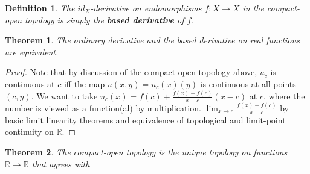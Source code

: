 \documentclass{article}
\newtheorem{thm}{Theorem}
\newtheorem*{define}{Definition}
\begin{document}
\begin{define}
  The $id_{X}$-derivative on endomorphisms $f: X \to X$ in the compact-open topology is simply the \textbf{based derivative} of $f$.
\end{define}


\begin{thm}
  The ordinary derivative and the based derivative on real functions are equivalent.
\end{thm}

\begin{proof}
  Note that by discussion of the compact-open topology above, $u_{c}$ is continuous at $c$ iff the map $u(x, y) = u_{c}(x)(y)$
  is continuous at all points $(c, y)$.
  We want to take $u_{c}(x) = f(c) + \frac{f(x) - f(c)}{x - c}(x - c)$ at $c$, where the number is viewed as a function(al) by multiplication.
  $\lim_{x \to c}\frac{f(x) - f(c)}{x - c}$ by basic limit linearity theorems and equivalence of topological and limit-point continuity on $\mathbb{R}$.
\end{proof}

\begin{thm}
  The compact-open topology is the unique topology on functions $\mathbb{R} \to \mathbb{R}$ that agrees with
\end{thm}
\end{document}
